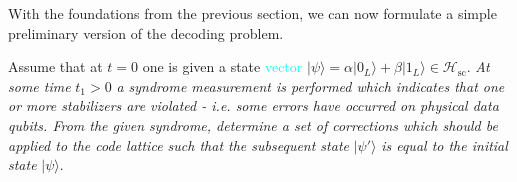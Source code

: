 \documentclass[twocolumn,preprintnumbers,amsmath,amssymb,notitlepage,nofootinbib,longbibliography,superscriptaddress,aps,pra,10pt]{revtex4-1}
\newcommand{\je}[1]{\textcolor{cyan}{#1}}
\begin{document}
	With the foundations from the previous section, we can now formulate a simple preliminary version of the decoding problem.

	\begin{problem}[\je{Decoding problem}]Assume that at $t=0$ one is given a state \je{vector} $|\psi\rangle = \alpha |0_L\rangle + \beta |1_L\rangle \in \mathcal{H}_{\mathrm{sc}}.$ \textit{At some time }$t_1>0$ \textit{a syndrome measurement is performed which indicates that one or more stabilizers are violated - i.e. some errors have occurred on physical data qubits. From the given syndrome, determine a set of corrections which should be applied to the code lattice such that the subsequent state} $|\psi'\rangle$ \textit{is equal to the initial state} $|\psi\rangle.$ 
	\end{problem}
	
\end{document}

